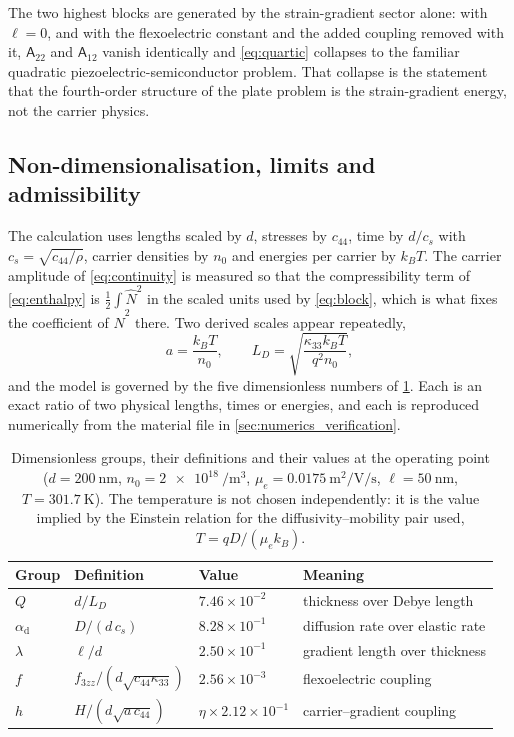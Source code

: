 The two highest blocks are
generated by the strain-gradient sector alone: with $\ell=0$, and with the
flexoelectric constant and the added coupling removed with it, $\mathsf A_{22}$
and $\mathsf A_{12}$ vanish identically and \eqref{eq:quartic} collapses to the
familiar quadratic piezoelectric-semiconductor problem.  That collapse is the
statement that the fourth-order structure of the plate problem is the
strain-gradient energy, not the carrier physics.

\subsection{Non-dimensionalisation, limits and admissibility}
\label{sec:governing_nondim}
\label{sec:governing_limits}
\label{sec:governing_stability}

The calculation uses lengths scaled by $d$, stresses by $c_{44}$, time by
$d/c_s$ with $c_s=\sqrt{c_{44}/\rho}$, carrier densities by $n_0$ and energies
per carrier by $k_BT$.  The carrier amplitude of \eqref{eq:continuity} is
measured so that the compressibility term of \eqref{eq:enthalpy} is
$\tfrac12\int\widehat N^{2}$ in the scaled units used by \eqref{eq:block}, which
is what fixes the coefficient of $\widehat N^{2}$ there.  Two derived scales appear repeatedly,
\begin{equation}
\label{eq:a_scale}
a=\frac{k_BT}{n_0},\qquad L_D=\sqrt{\frac{\kappa_{33}k_BT}{q^2n_0}},
\end{equation}
and the model is governed by the five dimensionless numbers of
\cref{tab:groups}.  Each is an exact ratio of two physical lengths, times or
energies, and each is reproduced numerically from the material file in
\cref{sec:numerics_verification}.

\begin{table}[t]
\centering
\caption{Dimensionless groups, their definitions and their values at the
operating point ($d=\SI{200}{\nano\metre}$,
$n_0=\SI{2e18}{\per\cubic\metre}$,
$\mu_e=\SI{0.0175}{\square\metre\per\volt\per\second}$, $\ell=\SI{50}{\nano\metre}$,
$T=\SI{301.7}{\kelvin}$).  The temperature is not chosen independently: it is
the value implied by the Einstein relation for the diffusivity--mobility pair
used, $T=qD/(\mu_ek_B)$.}
\label{tab:groups}
\begin{tabular}{@{}llll@{}}
\toprule
Group & Definition & Value & Meaning \\
\midrule
$Q$ & $d/L_D$ & $7.46\times10^{-2}$ & thickness over Debye length \\
$\alpha_{\mathrm{d}}$ & $D/(d\,c_s)$ & $8.28\times10^{-1}$ & diffusion rate over elastic rate \\
$\lambda$ & $\ell/d$ & $2.50\times10^{-1}$ & gradient length over thickness \\
$f$ & $f_{3zz}/(d\sqrt{c_{44}\kappa_{33}})$ & $2.56\times10^{-3}$ & flexoelectric coupling \\
$h$ & $H/(d\sqrt{a\,c_{44}})$ & $\eta\times2.12\times10^{-1}$ & carrier--gradient coupling \\
\bottomrule
\end{tabular}
\end{table}

